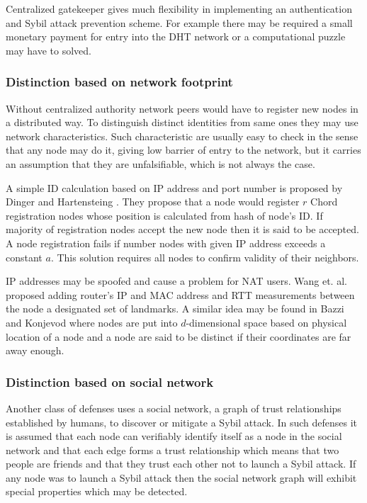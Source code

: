   Centralized gatekeeper gives much flexibility in implementing an
  authentication and Sybil attack prevention scheme. For example there may be
  required a small monetary payment for entry into the DHT network or a
  computational puzzle may have to solved.

  \subsubsection{Distinction based on network footprint}

  Without centralized authority network peers would have to register new nodes
  in a distributed way. To distinguish distinct identities from same ones they
  may use network characteristics. Such characteristic are usually easy to check
  in the sense that any node may do it, giving low barrier of entry to the
  network, but it carries an assumption that they are unfalsifiable, which is
  not always the case.

  A simple ID calculation based on IP address and port number is proposed by
  Dinger and Hartensteing \cite[p. 6]{dou02}. They propose that a node would
  register $r$ Chord registration nodes whose position is calculated from hash
  of node's ID. If majority of registration nodes accept the new node then it is
  said to be accepted. A node registration fails if number nodes with given IP
  address exceeds a constant $a$. This solution requires all nodes to confirm
  validity of their neighbors.

  IP addresses may be spoofed and cause a problem for NAT users. Wang et. al.
  \cite[p. 7]{dou02} proposed adding router's IP and MAC address and RTT
  measurements between the node a designated set of landmarks. A similar idea
  may be found in Bazzi and Konjevod \cite[p. 7]{dou02} where nodes are put into
  $d$-dimensional space based on physical location of a node and a node are said
  to be distinct if their coordinates are far away enough.

  \subsubsection{Distinction based on social network}

  Another class of defenses uses a social network, a graph of trust
  relationships established by humans, to discover or mitigate a Sybil attack.
  In such defenses it is assumed that each node can verifiably identify itself
  as a node in the social network and that each edge forms a trust relationship
  which means that two people are friends and that they trust each other not to
  launch a Sybil attack. If any node was to launch a Sybil attack then the
  social network graph will exhibit special properties which may be detected. 

